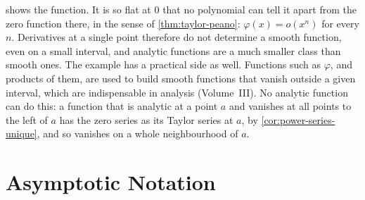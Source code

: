  shows the function. It is so flat at $0$ that no polynomial can tell it apart from the zero function there, in the sense of \cref{thm:taylor-peano}: $\varphi(x)=o(x^n)$ for every $n$. Derivatives at a single point therefore do not determine a smooth function, even on a small interval, and analytic functions are a much smaller class than smooth ones. The example has a practical side as well. Functions such as $\varphi$, and products of them, are used to build smooth functions that vanish outside a given interval, which are indispensable in analysis (Volume~III). No analytic function can do this: a function that is analytic at a point $a$ and vanishes at all points to the left of $a$ has the zero series as its Taylor series at $a$, by \cref{cor:power-series-unique}, and so vanishes on a whole neighbourhood of $a$.

\begin{table}
\end{table}

\section{Asymptotic Notation}
\label{sec:asymptotic-notation}

